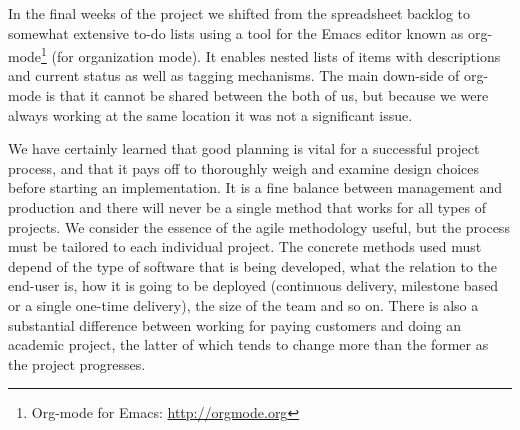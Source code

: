 In the final weeks of the project we shifted from the spreadsheet backlog to
somewhat extensive to-do lists using a tool for the Emacs editor known as
org-mode\footnote{Org-mode for Emacs: \url{http://orgmode.org}} (for
organization mode). It enables nested lists of items with descriptions and
current status as well as tagging mechanisms. The main down-side of org-mode is
that it cannot be shared between the both of us, but because we were always
working at the same location it was not a significant issue.

We have certainly learned that good planning is vital for a successful project
process, and that it pays off to thoroughly weigh and examine design choices
before starting an implementation. It is a fine balance between management and
production and there will never be a single method that works for all types of
projects. We consider the essence of the agile methodology useful, but the
process must be tailored to each individual project. The concrete methods used
must depend of the type of software that is being developed, what the relation
to the end-user is, how it is going to be deployed (continuous delivery,
milestone based or a single one-time delivery), the size of the team and so
on. There is also a substantial difference between working for paying customers
and doing an academic project, the latter of which tends to change more than the
former as the project progresses.

